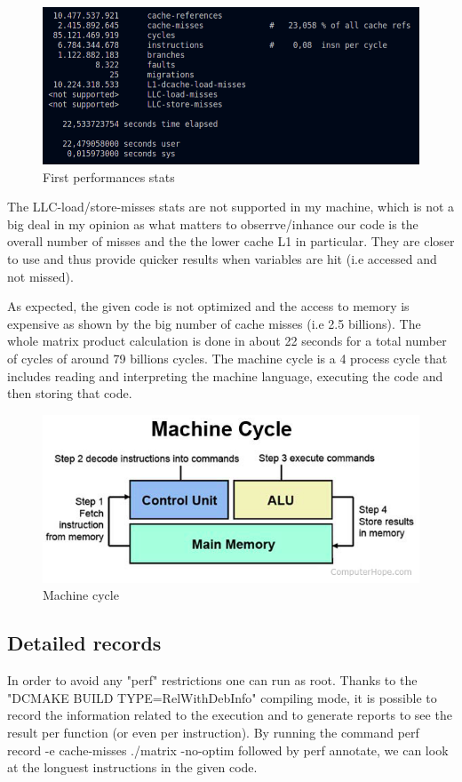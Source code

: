 \documentclass[a4paper, 10 pt, conference]{ieeeconf}
\begin{document}
\begin{figure}[h!]
  \center \includegraphics[scale=0.3]{pics/1.png}
  \caption{First performances stats}
  \label{}
\end{figure}


The LLC-load/store-misses stats are not supported in my machine, which is not a big deal in my opinion as what matters to obserrve/inhance our code is the overall number of misses and the the lower cache L1 in particular. They are closer to use and thus provide quicker results when variables are hit (i.e accessed and not missed).

As expected, the given code is not optimized and the access to memory is expensive as shown by the big number of cache misses (i.e 2.5 billions). The whole matrix product calculation is done in about 22 seconds for a total number of cycles of around 79 billions cycles. The machine cycle is a 4 process cycle that includes reading and interpreting the machine language, executing the code and then storing that code.

\begin{figure}[h!]
  \center \includegraphics[scale=0.3]{pics/cycle.png}
  \caption{Machine cycle \cite{2}}
  \label{}
\end{figure}

\newpage

\subsection{Detailed records}
In order to avoid any "perf" restrictions one can run as root. Thanks to the "DCMAKE BUILD TYPE=RelWithDebInfo" compiling mode, it is  possible to record the information related to the execution and to generate reports to see the result per function (or even per instruction). By running the command perf record -e cache-misses ./matrix -no-optim followed by perf annotate, we can look at the longuest instructions in the given code.
\end{document}
